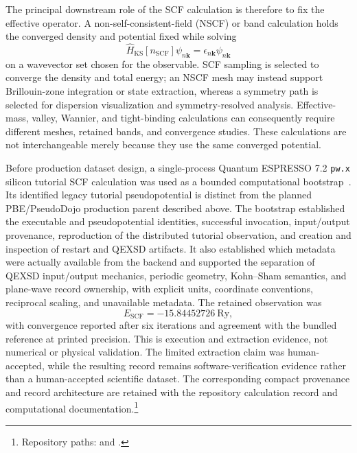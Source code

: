 \documentclass[preprint,12pt]{elsarticle}
\begin{document}
The principal downstream role of the SCF calculation is therefore to fix the
effective operator. A non-self-consistent-field (NSCF) or band calculation
holds the converged density and potential fixed while solving
\begin{equation}
 \hat{H}_{\mathrm{KS}}[n_{\mathrm{SCF}}]\psi_{n\bm{k}}
 =
 \epsilon_{n\bm{k}}\psi_{n\bm{k}}
\label{eq:nscf-kohn-sham}
\end{equation}
on a wavevector set chosen for the observable. SCF sampling is selected to
converge the density and total energy; an NSCF mesh may instead support
Brillouin-zone integration or state extraction, whereas a symmetry path is
selected for dispersion visualization and symmetry-resolved analysis.
Effective-mass, valley, Wannier, and tight-binding calculations can consequently
require different meshes, retained bands, and convergence studies. These
calculations are not interchangeable merely because they use the same
converged potential.

Before production dataset design, a single-process Quantum ESPRESSO 7.2
\texttt{pw.x} silicon tutorial SCF calculation was used as a bounded
computational bootstrap~\cite{giannozzi2009}. Its identified legacy tutorial
pseudopotential is distinct from the planned PBE/PseudoDojo production parent
described above. The bootstrap established the executable and pseudopotential
identities, successful invocation, input/output provenance,
reproduction of the distributed tutorial observation, and creation and
inspection of restart and QEXSD artifacts. It also established which metadata
were actually available from the backend and supported the separation of QEXSD
input/output mechanics, periodic geometry, Kohn--Sham semantics, and plane-wave
record ownership, with explicit units, coordinate conventions, reciprocal
scaling, and unavailable metadata. The retained observation was
\begin{equation}
 E_{\mathrm{SCF}}=-15.84452726\ \mathrm{Ry},
\label{eq:tutorial-scf-energy}
\end{equation}
with convergence reported after six iterations and agreement with the bundled
reference at printed precision. This is execution and extraction evidence, not
numerical or physical validation. The limited extraction claim was
human-accepted, while the resulting record remains software-verification
evidence rather than a human-accepted scientific dataset. The corresponding
compact provenance and record architecture are retained with the repository
calculation record and computational documentation.\footnote{Repository paths:
 and
.}
\end{document}
